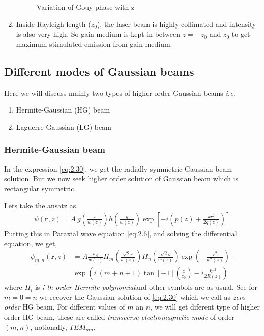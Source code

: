 \documentclass[11pt,a4paper]{article}
\numberwithin{equation}{section}
\begin{document}
\begin{enumerate}
	\begin{figure}[H]
		\centering
		\scalebox{0.7}{}
		\caption{Variation of Gouy phase with z}
		\label{fig:gouy}
	\end{figure}
	
	\item 
	Inside Rayleigh length ($z_0$), the laser beam is highly collimated and intensity is also very high. So gain medium is kept in between $z=-z_0$ and $z_0$ to get maximum stimulated emission from gain medium.
\end{enumerate}



\subsection{Different modes of Gaussian beams}
Here we will discuss mainly two types of higher order Gaussian beams \textit{i.e.}
\begin{enumerate}
	\item Hermite-Gaussian (HG) beam
	\item Laguerre-Gaussian (LG) beam
\end{enumerate}

\subsubsection{Hermite-Gaussian beam}
In the expression \ref{eq:2.30}, we get the radially symmetric Gaussian beam solution. But we now seek higher order solution of Gaussian beam which is rectangular symmetric.

Lets take the ansatz as,
 \begin{align}
 	\psi(\boldsymbol{r},z)= A \: g\left(\frac{x}{w(z)}\right) h\left(\frac{y}{w(z)}\right) \exp\left[-i\left(p(z) + \frac{kr^2}{2q(z)}\right)\right]
 \end{align}
Putting this in Paraxial wave equation \ref{eq:2.6}, and solving the differential equation,\cite{milonni} we get,
\begin{align}
	\psi_{m,n}(\boldsymbol{r},z)&= A \frac{w_0}{w(z)} H_m\left(\frac{\sqrt{2} x}{w(z)}\right) H_n\left(\frac{\sqrt{2} y}{w(z)}\right)\exp( -\frac{r^2}{w^2(z)}) \cdot\nonumber\\ 
	&\exp( i\:(m+n+1)\tan[-1](\frac{z}{z_0}) -i\frac{kr^2}{2R(z)})
\end{align}
where $H_i$ is \textit{i th order Hermite polynomial}and other symbols are as usual.
See for $m=0=n$ we recover the Gaussian solution of \ref{eq:2.30} which we call as \textit{zero order} HG beam. For different values of $m$ an $n$, we will get diferent type of higher order HG beam, these are called \textit{transverse electromagnetic mode} of order $(m,n)$, notionally, $TEM_{mn}$. 
\end{document}
